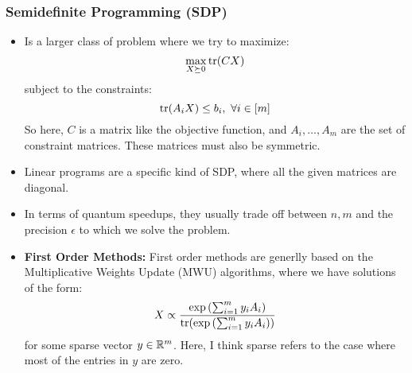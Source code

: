 \documentclass[10pt]{article}
\begin{document}
	\subsubsection{Semidefinite Programming (SDP)}
	\begin{itemize}
		\item Is a larger class of problem where we try to maximize:
			\[
			\max_{X \succeq 0} \tr(CX)
			\] 
			subject to the constraints:
			\[
				\tr (A_i X) \le b_i, \ \forall i \in [m]
			\] 
			So here, \( C \) is a matrix like the objective function, and \( A_i, \dots, A_m \) are the set of 
			constraint matrices. These matrices must also be symmetric. 


		\item Linear programs are a specific kind of SDP, where all the given matrices are diagonal. 
		\item In terms of quantum speedups, they usually trade off between \( n, m \) and the precision \( \epsilon \) 
			to which we solve the problem. 
		\item \textbf{First Order Methods:} First order methods are generlly based on the Multiplicative Weights 
			Update (MWU) algorithms, where we have solutions of the form:
			\[
				X \propto \frac{\mathrm{exp}\left( \sum_{i=1}^{m} y_i A_i \right)}{\tr(\mathrm{exp}\left( \sum_{i=1}^{m} y_i A_i \right))}
			\] 
			for some sparse vector \( y \in \mathbb R^{m} \). Here, I think sparse refers to the case where most of the 
			entries in \( y \) are zero. 


\end{itemize}
\end{document}
